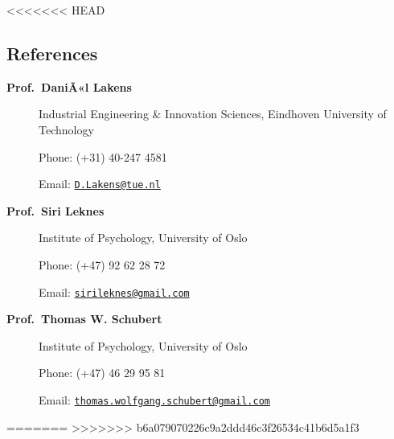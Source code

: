 \documentclass[]{article}
\begin{document}
\textless{}\textless{}\textless{}\textless{}\textless{}\textless{}\textless{}
HEAD

\subsection{References}\label{references}

\begin{description}
\item[\textbf{Prof.~DaniÃ«l Lakens}]
Industrial Engineering \& Innovation Sciences, Eindhoven University of
Technology

Phone: (+31) 40-247 4581

Email: \href{mailto:D.Lakens@tue.nl}{\nolinkurl{D.Lakens@tue.nl}}
\item[\textbf{Prof.~Siri Leknes}]
Institute of Psychology, University of Oslo

Phone: (+47) 92 62 28 72

Email:
\href{mailto:sirileknes@gmail.com}{\nolinkurl{sirileknes@gmail.com}}
\item[\textbf{Prof.~Thomas W. Schubert}]
Institute of Psychology, University of Oslo

Phone: (+47) 46 29 95 81

Email:
\href{mailto:thomas.wolfgang.schubert@gmail.com}{\nolinkurl{thomas.wolfgang.schubert@gmail.com}}
\end{description}

=======
\textgreater{}\textgreater{}\textgreater{}\textgreater{}\textgreater{}\textgreater{}\textgreater{}
b6a079070226c9a2ddd46c3f26534c41b6d5a1f3
\end{document}
